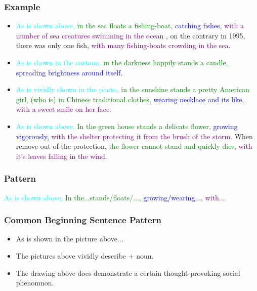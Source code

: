 \documentclass{article}
\begin{document}
\subsubsection{Example}
\label{sec:example-3}
\begin{itemize}
\item \textcolor{cyan}{As is shown above, } \textcolor{green}{in the sea floats a
    fishing-boat, } \textcolor{blue}{catching fishes, } \textcolor{purple}{with a number
    of sea creatures swimming in the ocean }, on the contrary in 1995, there was only one
  fish, \textcolor{purple}{with many fishing-boats crowding in the sea}.
  
\item \textcolor{cyan}{As is shown in the cartoon, } \textcolor{green}{in the darkness
    happily stands a candle, } \textcolor{blue}{spreading brightness around itself.}

\item \textcolor{cyan}{As is vividly shown in the photo, } \textcolor{green}{in the
    sunshine stands a pretty American girl, (who is) in Chinese traditional clothes, }
  \textcolor{blue}{wearing necklace and its like,} \textcolor{purple}{with a sweet smile
    on her face.}

\item \textcolor{cyan}{As is shown above, } \textcolor{green}{In the green house stands a
    delicate flower, }  \textcolor{blue}{growing vigorously, } \textcolor{purple}{with the
    shelter protecting it from the brush of the storm. } When remove out of the
  protection, \textcolor{green}{the flower cannot stand and quickly dies, }
  \textcolor{purple}{with it's leaves falling in the wind.}

\end{itemize}

\subsubsection{Pattern}
\label{sec:pattern}
\par \textcolor{cyan}{As is shown above, } \textcolor{green}{In the...stands/floats/..., }
\textcolor{blue}{growing/wearing..., } \textcolor{purple}{with...}

\subsubsection{Common Beginning Sentence Pattern}
\label{sec:comm-beginn-sent-2}

\begin{itemize}
\item As is shown in the picture above...
\item The pictures above vividly describe + noun.
\item The drawing above does demonstrate a certain thought-provoking social phenomnon.
\end{itemize}
\end{document}
